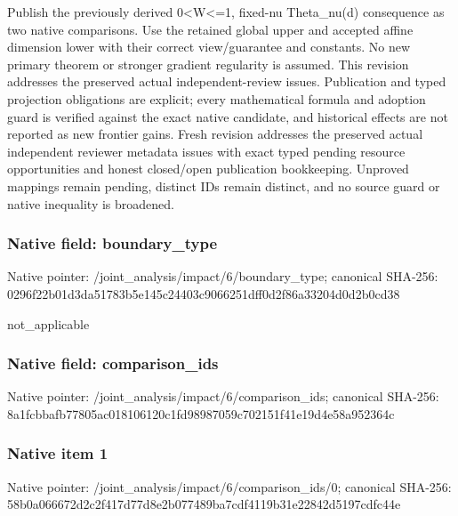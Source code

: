 \documentclass[10pt,a4paper]{article}
\begin{document}
\begingroup\raggedright\sloppy Publish the previously derived 0<W<=\allowbreak{}1,\allowbreak{} fixed-nu Theta\_\allowbreak{}nu(d) consequence as two native comparisons. Use the retained global upper and accepted affine dimension lower with their correct view/\allowbreak{}guarantee and constants. No new primary theorem or stronger gradient regularity is assumed. This revision addresses the preserved actual independent-review issues. Publication and typed projection obligations are explicit;\allowbreak{} every mathematical formula and adoption guard is verified against the exact native candidate,\allowbreak{} and historical effects are not reported as new frontier gains. Fresh revision addresses the preserved actual independent reviewer metadata issues with exact typed pending resource opportunities and honest closed/\allowbreak{}open publication bookkeeping. Unproved mappings remain pending,\allowbreak{} distinct IDs remain distinct,\allowbreak{} and no source guard or native inequality is broadened.\par\endgroup

\subsubsection{Native field: boundary\_\allowbreak{}type}
Native pointer: /joint\_\allowbreak{}analysis/impact/6/boundary\_\allowbreak{}type; canonical SHA-256: 0296f22b01d3da51783b5e145c24403c9066251dff0d2f86a33204d0d2b0cd38

\begingroup\raggedright\sloppy not\_\allowbreak{}applicable\par\endgroup

\subsubsection{Native field: comparison\_\allowbreak{}ids}
Native pointer: /joint\_\allowbreak{}analysis/impact/6/comparison\_\allowbreak{}ids; canonical SHA-256: 8a1fcbbafb77805ac018106120c1fd98987059c702151f41e19d4e58a952364c

\subsubsection{Native item 1}
Native pointer: /joint\_\allowbreak{}analysis/impact/6/comparison\_\allowbreak{}ids/0; canonical SHA-256: 58b0a066672d2c2f417d77d8e2b077489ba7cdf4119b31e22842d5197cdfc44e
\end{document}
